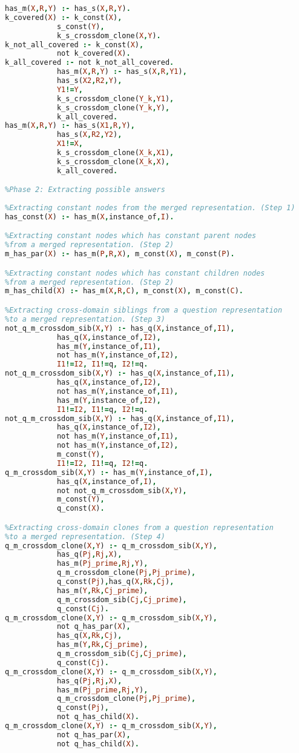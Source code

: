 \begin{lstlisting}[language=Prolog]
%Generating a merged representation of a sentence and a knowledge. (Step 5)
has_m(X,R,Y) :- has_s(X,R,Y).
k_covered(X) :- k_const(X),
			s_const(Y),
			k_s_crossdom_clone(X,Y).		
k_not_all_covered :- k_const(X),
			not k_covered(X).
k_all_covered :- not k_not_all_covered.
			has_m(X,R,Y) :- has_s(X,R,Y1),
			has_s(X2,R2,Y),
			Y1!=Y,
			k_s_crossdom_clone(Y_k,Y1),
			k_s_crossdom_clone(Y_k,Y),
			k_all_covered.
has_m(X,R,Y) :- has_s(X1,R,Y),
			has_s(X,R2,Y2),
			X1!=X,
			k_s_crossdom_clone(X_k,X1),
			k_s_crossdom_clone(X_k,X),
			k_all_covered.

%Phase 2: Extracting possible answers
 
%Extracting constant nodes from the merged representation. (Step 1)
has_const(X) :- has_m(X,instance_of,I).

%Extracting constant nodes which has constant parent nodes
%from a merged representation. (Step 2)
m_has_par(X) :- has_m(P,R,X), m_const(X), m_const(P).

%Extracting constant nodes which has constant children nodes
%from a merged representation. (Step 2)
m_has_child(X) :- has_m(X,R,C), m_const(X), m_const(C).

%Extracting cross-domain siblings from a question representation
%to a merged representation. (Step 3)
not_q_m_crossdom_sib(X,Y) :- has_q(X,instance_of,I1),
			has_q(X,instance_of,I2),
			has_m(Y,instance_of,I1),
			not has_m(Y,instance_of,I2),
			I1!=I2, I1!=q, I2!=q.
not_q_m_crossdom_sib(X,Y) :- has_q(X,instance_of,I1),
			has_q(X,instance_of,I2),
			not has_m(Y,instance_of,I1),
			has_m(Y,instance_of,I2),
			I1!=I2, I1!=q, I2!=q.
not_q_m_crossdom_sib(X,Y) :- has_q(X,instance_of,I1),
			has_q(X,instance_of,I2),
			not has_m(Y,instance_of,I1),
			not has_m(Y,instance_of,I2),
			m_const(Y),
			I1!=I2, I1!=q, I2!=q.
q_m_crossdom_sib(X,Y) :- has_m(Y,instance_of,I),
			has_q(X,instance_of,I),
			not not_q_m_crossdom_sib(X,Y),
			m_const(Y),
			q_const(X).

%Extracting cross-domain clones from a question representation
%to a merged representation. (Step 4)
q_m_crossdom_clone(X,Y) :- q_m_crossdom_sib(X,Y),
			has_q(Pj,Rj,X),
			has_m(Pj_prime,Rj,Y),
			q_m_crossdom_clone(Pj,Pj_prime),
			q_const(Pj),has_q(X,Rk,Cj),
			has_m(Y,Rk,Cj_prime),
			q_m_crossdom_sib(Cj,Cj_prime),
			q_const(Cj).
q_m_crossdom_clone(X,Y) :- q_m_crossdom_sib(X,Y),
			not q_has_par(X),
			has_q(X,Rk,Cj),
			has_m(Y,Rk,Cj_prime),
			q_m_crossdom_sib(Cj,Cj_prime),
			q_const(Cj).
q_m_crossdom_clone(X,Y) :- q_m_crossdom_sib(X,Y),
			has_q(Pj,Rj,X),
			has_m(Pj_prime,Rj,Y),
			q_m_crossdom_clone(Pj,Pj_prime),
			q_const(Pj),
			not q_has_child(X).
q_m_crossdom_clone(X,Y) :- q_m_crossdom_sib(X,Y),
			not q_has_par(X),
			not q_has_child(X).
			

\end{lstlisting}
